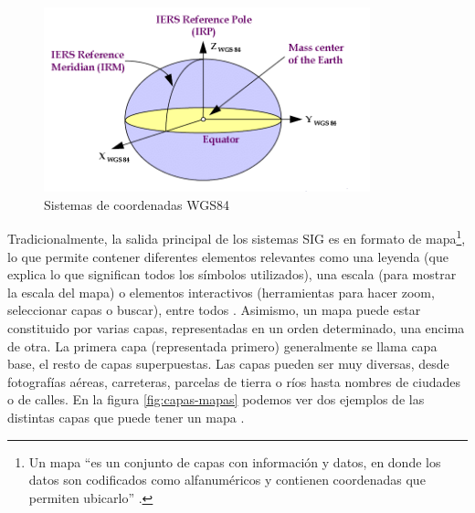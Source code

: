\begin{figure}[H]
	\centering
	\includegraphics[height=5.35cm]{imagenes/capitulo2/Figure-36-World-Geodetic-System-1984-WGS84}
	\caption{Sistemas de coordenadas WGS84 \cite{WGS84}}
	\label{fig:WGS84}
\end{figure}


Tradicionalmente, la salida principal de los sistemas SIG es en formato de mapa\footnote{Un mapa ``es un conjunto de capas con información y datos, en donde los datos son codificados como alfanuméricos y contienen coordenadas que permiten ubicarlo'' \cite{congreso-ritsi}.}, lo que permite contener diferentes elementos relevantes como una leyenda (que explica lo que significan todos los símbolos utilizados), una escala (para mostrar la escala del mapa) o elementos interactivos (herramientas para hacer zoom, seleccionar capas o buscar), entre todos \cite{tesis}. Asimismo, un mapa puede estar constituido por varias capas, representadas en un orden determinado, una encima de otra. La primera capa (representada primero) generalmente se llama capa base, el resto de capas superpuestas. Las capas pueden ser muy diversas, desde fotografías aéreas, carreteras, parcelas de tierra o ríos hasta nombres de ciudades o de calles. En la figura \ref{fig:capas-mapas} podemos ver dos ejemplos de las distintas capas que puede tener un mapa \cite{VictorOlaya}.

